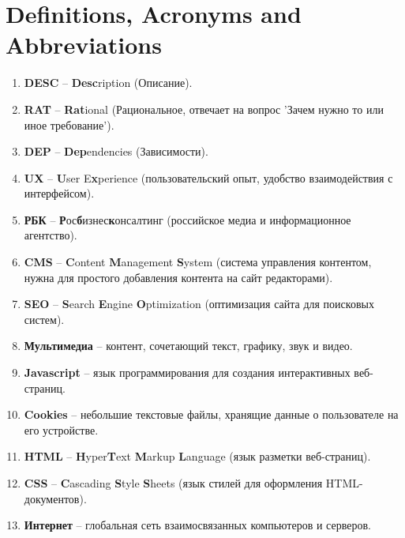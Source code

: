 \documentclass{scrreprt}
\begin{document}
\section{Definitions, Acronyms and Abbreviations}
\begin{enumerate}
\item\textbf{DESC} – \textbf{Desc}ription (Описание).

\item\textbf{RAT} – \textbf{Rat}ional (Рациональное, отвечает на вопрос 'Зачем нужно то или иное требование').

\item\textbf{DEP} – \textbf{Dep}endencies (Зависимости).

\item\textbf{UX} – \textbf{U}ser E\textbf{x}perience (пользовательский опыт, удобство взаимодействия с интерфейсом).

\item\textbf{РБК} – \textbf{Р}ос\textbf{б}изнес\textbf{к}онсалтинг (российское медиа и информационное агентство).

\item\textbf{CMS} – \textbf{C}ontent \textbf{M}anagement \textbf{S}ystem (система управления контентом, нужна для простого добавления контента на сайт редакторами).

\item\textbf{SEO} – \textbf{S}earch \textbf{E}ngine \textbf{O}ptimization (оптимизация сайта для поисковых систем).

\item\textbf{Мультимедиа} – контент, сочетающий текст, графику, звук и вид\textbf{}ео.

\item\textbf{Javascript} – язык программирования для создания интерактивных веб-страниц.

\item\textbf{Cookies} – небольшие текстовые файлы, хранящие данные о пользователе на его устройстве.

\item\textbf{HTML} – \textbf{H}yper\textbf{T}ext \textbf{M}arkup \textbf{L}anguage (язык разметки веб-страниц).

\item\textbf{CSS} – \textbf{C}ascading \textbf{S}tyle \textbf{S}heets (язык стилей для оформления HTML-документов).

\item\textbf{Интернет} – глобальная сеть взаимосвязанных компьютеров и серверов.


\end{enumerate}
\end{document}
